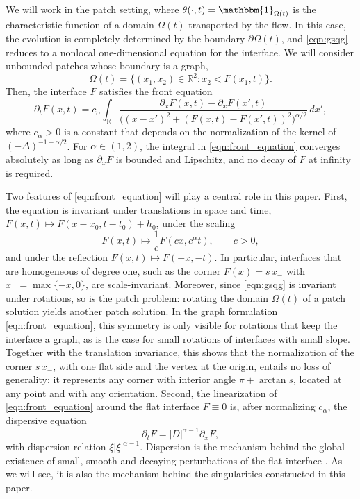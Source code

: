\documentclass[11pt]{amsart}
\theoremstyle{definition}
\theoremstyle{remark}
\numberwithin{equation}{section}
\newcommand{\R}{\mathbb{R}}
\begin{document}
We will work in the patch setting, where $\theta(\cdot, t) = \mathbbm{1}_{\Omega(t)}$ is the characteristic function of a domain $\Omega(t)$ transported by the flow. In this case, the evolution is completely determined by the boundary $\partial\Omega(t)$, and \eqref{eqn:gsqg} reduces to a nonlocal one-dimensional equation for the interface. We will consider unbounded patches whose boundary is a graph,
\[\Omega(t) = \{(x_1, x_2) \in \R^2 : x_2 < F(x_1, t)\}.\]
Then, the interface $F$ satisfies the front equation
\begin{equation}\label{eqn:front_equation}
    \partial_t F(x,t) = c_\alpha\int_{\R}
    \frac{\partial_x F(x,t)-\partial_x F(x',t)}
    {\big((x-x')^2+(F(x,t)-F(x',t))^2\big)^{\alpha/2}}\,dx',
\end{equation}
where $c_\alpha > 0$ is a constant that depends on the normalization of the kernel of $(-\Delta)^{-1 + \alpha/2}$.  For $\alpha \in (1,2)$, the integral in \eqref{eqn:front_equation} converges absolutely as long as $\partial_x F$ is bounded and Lipschitz, and no decay of $F$ at infinity is required.

Two features of \eqref{eqn:front_equation} will play a central role in this paper. First, the equation is invariant under translations in space and time, $F(x,t) \mapsto F(x - x_0, t - t_0) + h_0$, under the scaling
\[F(x,t) \mapsto \frac{1}{c}F(cx, c^{\alpha}t), \qquad c > 0,\]
and under the reflection $F(x,t) \mapsto F(-x,-t)$. In particular, interfaces that are homogeneous of degree one, such as the corner $F(x) = s\, x_-$ with $x_- = \max\{-x, 0\}$, are scale-invariant. Moreover, since \eqref{eqn:gsqg} is invariant under rotations, so is the patch problem: rotating the domain $\Omega(t)$ of a patch solution yields another patch solution. In the graph formulation \eqref{eqn:front_equation}, this symmetry is only visible for rotations that keep the interface a graph, as is the case for small rotations of interfaces with small slope. Together with the translation invariance, this shows that the normalization of the corner $s\, x_-$, with one flat side and the vertex at the origin, entails no loss of generality: it represents any corner with interior angle $\pi + \arctan s$, located at any point and with any orientation. Second, the linearization of \eqref{eqn:front_equation} around the flat interface $F \equiv 0$ is, after normalizing $c_\alpha$, the dispersive equation
\[\partial_t F = |D|^{\alpha-1}\partial_x F,\]
with dispersion relation $\xi|\xi|^{\alpha-1}$. Dispersion is the mechanism behind the global existence of small, smooth and decaying perturbations of the flat interface \cite{Cordoba-GomezSerrano-Ionescu:global-generalized-sqg-patch}. As we will see, it is also the mechanism behind the singularities constructed in this paper.
\end{document}
